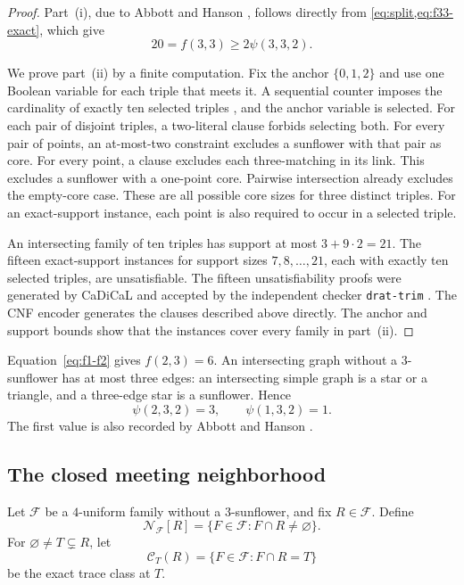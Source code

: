 \documentclass[11pt]{article}
\numberwithin{equation}{section}
\theoremstyle{definition}
\theoremstyle{remark}
\newcommand{\F}{\mathcal F}
\newcommand{\C}{\mathcal C}
\begin{document}
\begin{proof}
Part~(i), due to Abbott and Hanson \cite[p.~9]{AbbottHanson1974}, follows
directly from \cref{eq:split,eq:f33-exact}, which give
\[
 20=f(3,3)\ge2\psi(3,3,2).
\]

We prove part~(ii) by a finite computation. Fix the anchor $\{0,1,2\}$ and
use one Boolean variable for each triple that meets it. A sequential counter
imposes the cardinality of exactly ten selected triples
\cite{Sinz2005}, and the anchor variable is selected. For each pair of
disjoint triples, a two-literal clause forbids selecting both.
For every pair of points, an at-most-two constraint excludes a sunflower with
that pair as core. For every point, a clause excludes each three-matching in
its link. This excludes a sunflower with a one-point core. Pairwise
intersection already excludes the empty-core case. These are all possible
core sizes for three distinct triples. For an exact-support instance, each
point is also required to occur in a selected triple.

An intersecting family of ten triples has support at most
$3+9\cdot2=21$. The fifteen exact-support instances for support sizes
$7,8,\ldots,21$, each with exactly ten selected triples, are unsatisfiable.
The fifteen unsatisfiability proofs were generated by CaDiCaL
\cite{BiereEtAl2024} and accepted by the independent checker
\texttt{drat-trim} \cite{WetzlerHeuleHunt2014}. The CNF encoder generates the
clauses described above directly. The anchor and support bounds show that
the instances cover every family in part~(ii).
\end{proof}
Equation~\eqref{eq:f1-f2} gives
$f(2,3)=6$. An intersecting graph without a $3$-sunflower has at most
three edges: an intersecting simple graph is a star or a triangle, and a
three-edge star is a sunflower. Hence
\begin{equation}
 \psi(2,3,2)=3,
 \qquad
 \psi(1,3,2)=1.
 \label{eq:f43-small-psi}
\end{equation}
The first value is also recorded by Abbott and Hanson
\cite[p.~9]{AbbottHanson1974}.

\subsection{The closed meeting neighborhood}

Let $\F$ be a $4$-uniform family without a $3$-sunflower, and fix
$R\in\F$. Define
\[
 \mathcal N_{\F}[R]=\{F\in\F:F\cap R\ne\varnothing\}.
\]
For $\varnothing\ne T\subsetneq R$, let
\[
 \C_T(R)=\{F\in\F:F\cap R=T\}
\]
be the exact trace class at $T$.
\end{document}
